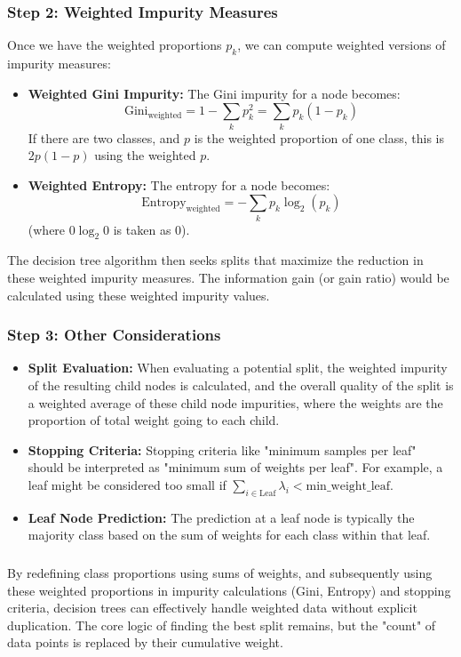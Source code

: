 \documentclass{article}
\begin{document}
\subsubsection*{Step 2: Weighted Impurity Measures}
\parbox{\textwidth}{
Once we have the weighted proportions $p_k$, we can compute weighted versions of impurity measures:
\begin{itemize}
    \item \textbf{Weighted Gini Impurity:} The Gini impurity for a node becomes:
    $$ \text{Gini}_{\text{weighted}} = 1 - \sum_{k} p_k^2 = \sum_{k} p_k (1-p_k) $$
    If there are two classes, and $p$ is the weighted proportion of one class, this is $2p(1-p)$ using the weighted $p$.

    \item \textbf{Weighted Entropy:} The entropy for a node becomes:
    $$ \text{Entropy}_{\text{weighted}} = - \sum_{k} p_k \log_2(p_k) $$
    (where $0 \log_2 0$ is taken as 0).
\end{itemize}
The decision tree algorithm then seeks splits that maximize the reduction in these weighted impurity measures. The information gain (or gain ratio) would be calculated using these weighted impurity values.
}

\subsubsection*{Step 3: Other Considerations}
\parbox{\textwidth}{
\begin{itemize}
    \item \textbf{Split Evaluation:} When evaluating a potential split, the weighted impurity of the resulting child nodes is calculated, and the overall quality of the split is a weighted average of these child node impurities, where the weights are the proportion of total weight going to each child.
    \item \textbf{Stopping Criteria:} Stopping criteria like "minimum samples per leaf" should be interpreted as "minimum sum of weights per leaf". For example, a leaf might be considered too small if $\sum_{i \in \text{Leaf}} \lambda_i < \text{min\_weight\_leaf}$.
    \item \textbf{Leaf Node Prediction:} The prediction at a leaf node is typically the majority class based on the sum of weights for each class within that leaf.
\end{itemize}
}

\subsubsection*{}
\parbox{\textwidth}{
By redefining class proportions using sums of weights, and subsequently using these weighted proportions in impurity calculations (Gini, Entropy) and stopping criteria, decision trees can effectively handle weighted data without explicit duplication. The core logic of finding the best split remains, but the "count" of data points is replaced by their cumulative weight.
}
\end{document}
